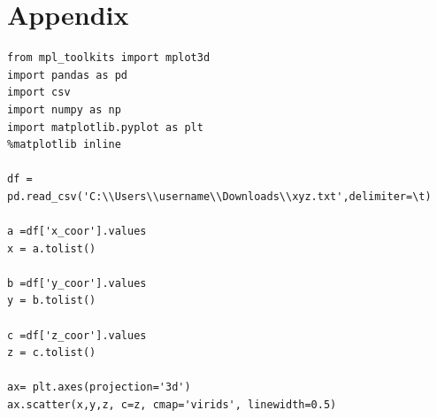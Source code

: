 \documentclass[11pt, A4paper]{article}
\begin{document}
\newpage
\section{Appendix}

\begin{lstlisting}[label={list:first},caption=Python Code for Visualization.]
from mpl_toolkits import mplot3d
import pandas as pd
import csv
import numpy as np
import matplotlib.pyplot as plt
%matplotlib inline

df = pd.read_csv('C:\\Users\\username\\Downloads\\xyz.txt',delimiter=\t)

a =df['x_coor'].values
x = a.tolist()

b =df['y_coor'].values
y = b.tolist()

c =df['z_coor'].values
z = c.tolist()

ax= plt.axes(projection='3d')
ax.scatter(x,y,z, c=z, cmap='virids', linewidth=0.5)

\end{lstlisting}
\end{document}
